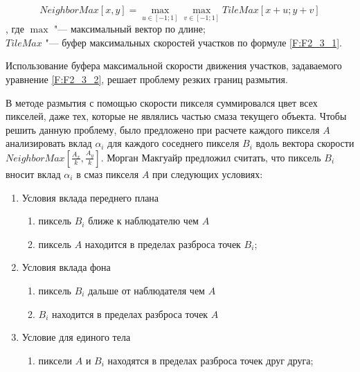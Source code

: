 \begin{eqndesc}
    \begin{equation}\label{F:F2_3_2}
        NeighborMax[x,y] = \max_{u \in [-1 ; 1]} {
            \max_{v \in [-1 ;1]} {TileMax [x + u; y + v]}
        }
    \end{equation}
    , где $\max$ "--- максимальный вектор по длине; \\
    $TileMax$ "---  буфер максимальных скоростей участков по формуле \eqref{F:F2_3_1}.
\end{eqndesc}

Использование буфера максимальной скорости движения участков, задаваемого уравнение \eqref{F:F2_3_2}, решает проблему резких границ размытия.
\par
В методе размытия с помощью скорости пикселя суммировался цвет всех пикселей, даже тех, которые не являлись частью смаза текущего объекта. Чтобы решить данную проблему, было предложено при расчете каждого пикселя $A$ анализировать вклад $\alpha_i$ для каждого соседнего пикселя $B_i$ вдоль  вектора скорости $NeighborMax[\frac{A_x}{k}, \frac{A_y}{k}]$. Морган Макгуайр предложил считать, что пиксель $B_i$ вносит вклад $\alpha_i$ в смаз пикселя $A$ при следующих условиях:
\begin{enumerate}
    \item Условия вклада переднего плана
          \begin{enumerate}
              \item пиксель $B_i$ ближе к наблюдателю чем $A$
              \item пиксель $A$ находится в пределах разброса точек $B_i$;
          \end{enumerate}
    \item Условия вклада фона
          \begin{enumerate}
              \item пиксель $B_i$ дальше от наблюдателя чем $A$
              \item $B_i$ находится в пределах разброса точек $A$
          \end{enumerate}
    \item Условие для единого тела
          \begin{enumerate}
              \item пиксели $A$ и $B_i$ находятся в пределах разброса точек друг друга;
          \end{enumerate}
\end{enumerate}



